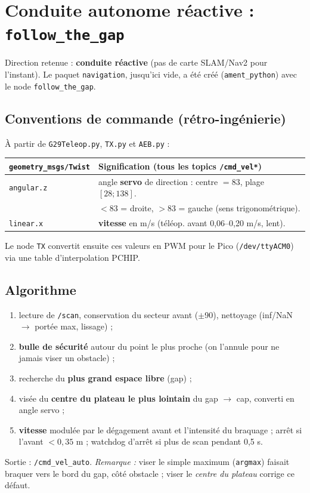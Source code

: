 \documentclass[a4paper,11pt]{article}
\begin{document}
\section{Conduite autonome réactive : \texttt{follow\_the\_gap}}
Direction retenue : \textbf{conduite réactive} (pas de carte SLAM/Nav2 pour
l'instant). Le paquet \texttt{navigation}, jusqu'ici vide, a été créé
(\texttt{ament\_python}) avec le node \texttt{follow\_the\_gap}.

\subsection{Conventions de commande (rétro-ingénierie)}
À partir de \texttt{G29Teleop.py}, \texttt{TX.py} et \texttt{AEB.py} :
\begin{center}
\begin{tabularx}{\textwidth}{@{}l X@{}}
\toprule
\texttt{geometry\_msgs/Twist} & Signification (tous les topics \texttt{/cmd\_vel*}) \\
\midrule
\texttt{angular.z} & angle \textbf{servo} de direction : centre $=83$, plage $[28;138]$. \\
                   & $<83$ = droite, $>83$ = gauche (sens trigonométrique). \\
\texttt{linear.x}  & \textbf{vitesse} en m/s (téléop. avant 0,06--0,20 m/s, lent). \\
\bottomrule
\end{tabularx}
\end{center}
Le node \texttt{TX} convertit ensuite ces valeurs en PWM pour le Pico
(\texttt{/dev/ttyACM0}) via une table d'interpolation PCHIP.

\subsection{Algorithme}
\begin{enumerate}[leftmargin=1.6em]
  \item lecture de \texttt{/scan}, conservation du secteur avant ($\pm$90\textdegree),
        nettoyage (inf/NaN $\rightarrow$ portée max, lissage) ;
  \item \textbf{bulle de sécurité} autour du point le plus proche (on l'annule
        pour ne jamais viser un obstacle) ;
  \item recherche du \textbf{plus grand espace libre} (gap) ;
  \item visée du \textbf{centre du plateau le plus lointain} du gap
        $\rightarrow$ cap, converti en angle servo ;
  \item \textbf{vitesse} modulée par le dégagement avant et l'intensité du
        braquage ; arrêt si l'avant $<0{,}35$ m ; watchdog d'arrêt si plus de
        scan pendant 0,5 s.
\end{enumerate}
Sortie : \texttt{/cmd\_vel\_auto}.
\emph{Remarque :} viser le simple maximum (\texttt{argmax}) faisait braquer vers
le bord du gap, côté obstacle ; viser le \emph{centre du plateau} corrige ce
défaut.
\end{document}
